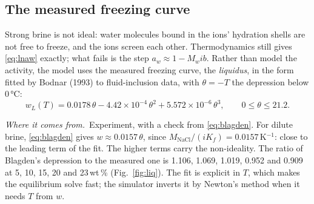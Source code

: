 \documentclass[11pt,a4paper]{article}
\newcommand{\where}{\par\noindent\textit{Where it comes from.}\ }
\begin{document}
\subsection{The measured freezing curve}
\label{sec:liquidus}
Strong brine is not ideal: water molecules bound in the ions' hydration shells are not free to
freeze, and the ions screen each other. Thermodynamics still gives \eqref{eq:lnaw} exactly; what
fails is the step $a_w \approx 1 - M_w i b$. Rather than model the activity, the model uses the
measured freezing curve, the \emph{liquidus}, in the form fitted by Bodnar (1993) to fluid-inclusion
data, with $\theta = -T$ the depression below 0\,°C:
\begin{equation}
w_L(T) = 0.0178\,\theta - 4.42\times10^{-4}\,\theta^2 + 5.572\times10^{-6}\,\theta^3,
\qquad 0 \le \theta \le 21.2 .
\label{eq:bodnar}
\end{equation}
\where Experiment, with a check from \eqref{eq:blagden}. For dilute brine, \eqref{eq:blagden} gives
$w \approx 0.0157\,\theta$, since $M_{\text{NaCl}}/(i K_f) = 0.0157$\,K$^{-1}$: close to the leading
term of the fit. The higher terms carry the non-ideality. The ratio of Blagden's depression to the measured one is 1.106,
1.069, 1.019, 0.952 and 0.909 at 5, 10, 15, 20 and 23\,wt\,\% (Fig.~\ref{fig:liq}). The fit is explicit
in $T$, which makes the equilibrium solve fast; the simulator inverts it by Newton's method when it
needs $T$ from $w$.
\end{document}
